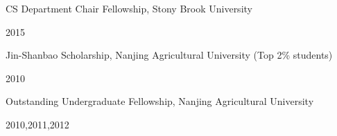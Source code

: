 


\begin{cvhonors}


\cvhonor
{
\begin{cvitems}
\item{CS Department Chair Fellowship, Stony Brook University}
\end{cvitems}
}
{2015}

\cvhonor
{
\begin{cvitems}
\item{Jin-Shanbao Scholarship, Nanjing Agricultural University (Top 2\% students)}
\end{cvitems}
}
{2010}

\cvhonor
{
\begin{cvitems}
\item{Outstanding Undergraduate Fellowship, Nanjing Agricultural University}
\end{cvitems}
}
{2010,2011,2012}

\end{cvhonors}

